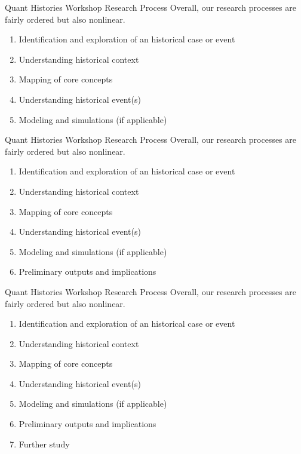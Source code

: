 \documentclass[10pt]{beamer} %
\theoremstyle{plain} %
\theoremstyle{definition} %
\begin{document}
\begin{frame}{\color{Maroon} \small Quant Histories Workshop Research Process}
Overall, our research processes are fairly ordered but also nonlinear.
\vfill
\begin{enumerate}
\item Identification and exploration of an historical case or event
\item Understanding historical context
\item Mapping of core concepts
\item Understanding historical event(s)
\item Modeling and simulations (if applicable)
\end{enumerate}
\vfill
\end{frame}

\begin{frame}{\color{Maroon} \small Quant Histories Workshop Research Process}
Overall, our research processes are fairly ordered but also nonlinear.
\vfill
\begin{enumerate}
\item Identification and exploration of an historical case or event
\item Understanding historical context
\item Mapping of core concepts
\item Understanding historical event(s)
\item Modeling and simulations (if applicable)
\item Preliminary outputs and implications
\end{enumerate}
\vfill
\end{frame}

\begin{frame}{\color{Maroon} \small Quant Histories Workshop Research Process}
Overall, our research processes are fairly ordered but also nonlinear.
\vfill
\begin{enumerate}
\item Identification and exploration of an historical case or event
\item Understanding historical context
\item Mapping of core concepts
\item Understanding historical event(s)
\item Modeling and simulations (if applicable)
\item Preliminary outputs and implications
\item Further study
\end{enumerate}
\vfill
\end{frame}
\end{document}
